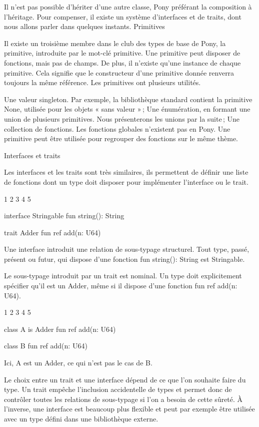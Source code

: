\documentclass[11pt, oneside]{article}   	%
\begin{document}
Il n’est pas possible d’hériter d’une autre classe, Pony préférant la composition à l’héritage. Pour compenser, il existe un système d’interfaces et de traits, dont nous allons parler dans quelques instants.
Primitives

Il existe un troisième membre dans le club des types de base de Pony, la primitive, introduite par le mot-clé primitive. Une primitive peut disposer de fonctions, mais pas de champs. De plus, il n’existe qu’une instance de chaque primitive. Cela signifie que le constructeur d’une primitive donnée renverra toujours la même référence. Les primitives ont plusieurs utilités.

    Une valeur singleton. Par exemple, la bibliothèque standard contient la primitive None, utilisée pour les objets « sans valeur » ;
    Une énumération, en formant une union de plusieurs primitives. Nous présenterons les unions par la suite ;
    Une collection de fonctions. Les fonctions globales n’existent pas en Pony. Une primitive peut être utilisée pour regrouper des fonctions sur le même thème.

Interfaces et traits

Les interfaces et les traits sont très similaires, ils permettent de définir une liste de fonctions dont un type doit disposer pour implémenter l’interface ou le trait.

1
2
3
4
5

	

interface Stringable
  fun string(): String

trait Adder
  fun ref add(n: U64)

Une interface introduit une relation de sous-typage structurel. Tout type, passé, présent ou futur, qui dispose d’une fonction fun string(): String est Stringable.

Le sous-typage introduit par un trait est nominal. Un type doit explicitement spécifier qu’il est un Adder, même si il dispose d’une fonction fun ref add(n: U64).

1
2
3
4
5

	

class A is Adder
  fun ref add(n: U64)

class B
  fun ref add(n: U64)

Ici, A est un Adder, ce qui n’est pas le cas de B.

Le choix entre un trait et une interface dépend de ce que l’on souhaite faire du type. Un trait empêche l’inclusion accidentelle de types et permet donc de contrôler toutes les relations de sous-typage si l’on a besoin de cette sûreté. À l’inverse, une interface est beaucoup plus flexible et peut par exemple être utilisée avec un type défini dans une bibliothèque externe.
\end{document}
